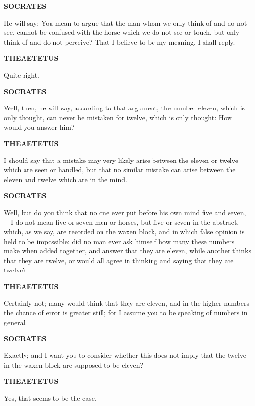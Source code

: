 \documentclass[11pt,letter]{article}
\begin{document}
\par \textbf{SOCRATES}
\par   He will say:  You mean to argue that the man whom we only think of and do not see, cannot be confused with the horse which we do not see or touch, but only think of and do not perceive? That I believe to be my meaning, I shall reply.

\par \textbf{THEAETETUS}
\par   Quite right.

\par \textbf{SOCRATES}
\par   Well, then, he will say, according to that argument, the number eleven, which is only thought, can never be mistaken for twelve, which is only thought:  How would you answer him?

\par \textbf{THEAETETUS}
\par   I should say that a mistake may very likely arise between the eleven or twelve which are seen or handled, but that no similar mistake can arise between the eleven and twelve which are in the mind.

\par \textbf{SOCRATES}
\par   Well, but do you think that no one ever put before his own mind five and seven,—I do not mean five or seven men or horses, but five or seven in the abstract, which, as we say, are recorded on the waxen block, and in which false opinion is held to be impossible; did no man ever ask himself how many these numbers make when added together, and answer that they are eleven, while another thinks that they are twelve, or would all agree in thinking and saying that they are twelve?

\par \textbf{THEAETETUS}
\par   Certainly not; many would think that they are eleven, and in the higher numbers the chance of error is greater still; for I assume you to be speaking of numbers in general.

\par \textbf{SOCRATES}
\par   Exactly; and I want you to consider whether this does not imply that the twelve in the waxen block are supposed to be eleven?

\par \textbf{THEAETETUS}
\par   Yes, that seems to be the case.
\end{document}
